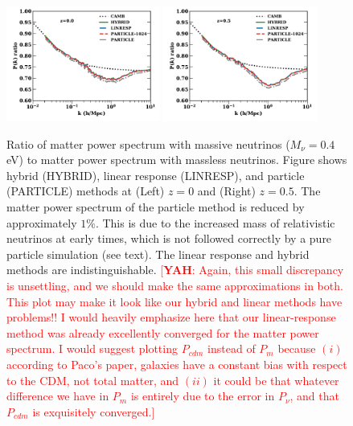 \documentclass[useAMS, usenatbib]{mnras}
\newcommand{\yah}[1]{{\textcolor{red}{[{\bf YAH}: #1]}}}
\begin{document}
\begin{figure}
\includegraphics[width=0.45\textwidth]{nuplots/pks_rel-10.pdf}
\includegraphics[width=0.45\textwidth]{nuplots/pks_rel-0_66670.pdf}
  \caption{Ratio of matter power spectrum with massive neutrinos ($M_\nu = 0.4$ eV) to matter power spectrum with massless neutrinos. Figure shows hybrid (HYBRID), linear response (LINRESP), and particle (PARTICLE) methods at (Left) $z=0$ and (Right) $z=0.5$. The matter power spectrum of the particle method is reduced by approximately $1\%$. This is due to the increased mass of relativistic neutrinos at early times, which is not followed correctly by a pure particle simulation (see text). The linear response and hybrid methods are indistinguishable. \yah{Again, this small discrepancy is unsettling, and we should make the same approximations in both. This plot may make it look like our hybrid and linear methods have problems!! I would heavily emphasize here that our linear-response method was already excellently converged for the matter power spectrum. I would suggest plotting $P_{cdm}$ instead of $P_m$ because $(i)$ according to Paco's paper, galaxies have a constant bias with respect to the CDM, not total matter, and $(ii)$ it could be that whatever difference we have in $P_m$ is entirely due to the error in $P_\nu$, and that $P_{cdm}$ is exquisitely converged.}
  }
  \label{fig:matter_power}
\end{figure}
\end{document}
